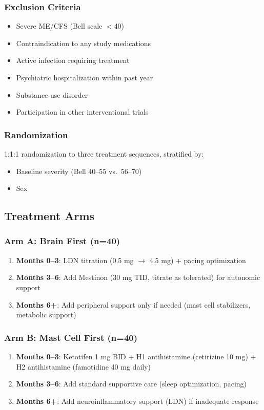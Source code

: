 \subsubsection{Exclusion Criteria}
\begin{itemize}
    \item Severe ME/CFS (Bell scale $<$40)
    \item Contraindication to any study medications
    \item Active infection requiring treatment
    \item Psychiatric hospitalization within past year
    \item Substance use disorder
    \item Participation in other interventional trials
\end{itemize}

\subsubsection{Randomization}
1:1:1 randomization to three treatment sequences, stratified by:
\begin{itemize}
    \item Baseline severity (Bell 40--55 vs.\ 56--70)
    \item Sex
\end{itemize}

\subsection{Treatment Arms}

\subsubsection{Arm A: Brain First (n=40)}
\begin{enumerate}
    \item \textbf{Months 0--3}: LDN titration (0.5 mg $\to$ 4.5 mg) + pacing optimization
    \item \textbf{Months 3--6}: Add Mestinon (30 mg TID, titrate as tolerated) for autonomic support
    \item \textbf{Months 6+}: Add peripheral support only if needed (mast cell stabilizers, metabolic support)
\end{enumerate}

\subsubsection{Arm B: Mast Cell First (n=40)}
\begin{enumerate}
    \item \textbf{Months 0--3}: Ketotifen 1 mg BID + H1 antihistamine (cetirizine 10 mg) + H2 antihistamine (famotidine 40 mg daily)
    \item \textbf{Months 3--6}: Add standard supportive care (sleep optimization, pacing)
    \item \textbf{Months 6+}: Add neuroinflammatory support (LDN) if inadequate response
\end{enumerate}

